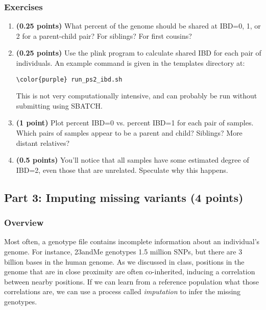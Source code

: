 \documentclass[12pt]{article}
\begin{document}
\subsubsection*{Exercises}
\begin{enumerate}
\item \textbf{(0.25 points)} What percent of the genome should be shared at IBD=0, 1, or 2 for a parent-child pair? For siblings? For first cousins?

\item \textbf{(0.25 points)} Use the plink program to calculate shared IBD for each pair of individuals. An example command is given in the templates directory at:
\begin{Verbatim}[commandchars=\\\{\}]
\color{purple} run_ps2_ibd.sh
\end{Verbatim}
This is not very computationally intensive, and can probably be run without submitting using SBATCH.

\item \textbf{(1 point)} Plot percent IBD=0 vs. percent IBD=1 for each pair of samples. Which pairs of samples appear to be a parent and child? Siblings? More distant relatives? 

\item \textbf{(0.5 points)} You'll notice that all samples have some estimated degree of IBD=2, even those that are unrelated. Speculate why this happens.

\end{enumerate}

\subsection*{Part 3: Imputing missing variants (4 points)}

\subsubsection*{Overview}

Most often, a genotype file contains incomplete information about an individual's genome. For instance, 23andMe genotypes 1.5 million SNPs, but there are 3 billion bases in the human genome. As we discussed in class, positions in the genome that are in close proximity are often co-inherited, inducing a correlation between nearby positions. If we can learn from a reference population what those correlations are, we can use a process called \emph{imputation} to infer the missing genotypes.
\end{document}
